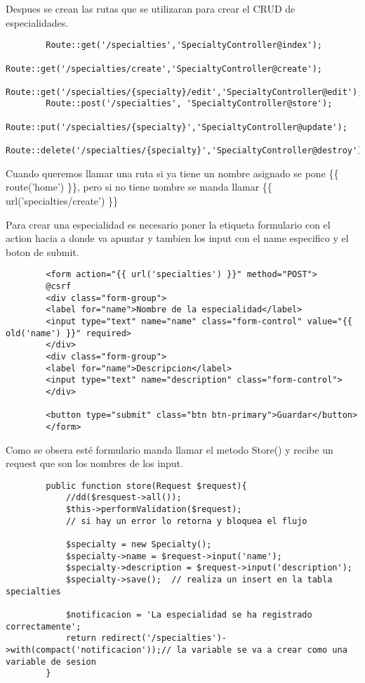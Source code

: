 \documentclass[a4paper]{article}
\begin{document}
	Despues se crean las rutas que se utilizaran para crear el CRUD de especialidades.
	
	\begin{lstlisting}
		Route::get('/specialties','SpecialtyController@index');
		Route::get('/specialties/create','SpecialtyController@create');
		Route::get('/specialties/{specialty}/edit','SpecialtyController@edit');
		Route::post('/specialties', 'SpecialtyController@store');
		Route::put('/specialties/{specialty}','SpecialtyController@update');
		Route::delete('/specialties/{specialty}','SpecialtyController@destroy');
	\end{lstlisting}  

	Cuando queremos llamar una ruta si ya tiene un nombre asignado se pone \{\{ route('home') \}\}, pero si no tiene nombre se manda llamar \{\{ url('specialties/create') \}\}
	
	
	Para crear una especialidad es necesario poner la etiqueta formulario con el action hacia a donde va apuntar y tambien los input con el name especifico y el boton de submit.
	
	\begin{lstlisting}
		<form action="{{ url('specialties') }}" method="POST">
		@csrf
		<div class="form-group">
		<label for="name">Nombre de la especialidad</label>
		<input type="text" name="name" class="form-control" value="{{ old('name') }}" required>
		</div>
		<div class="form-group">
		<label for="name">Descripcion</label>
		<input type="text" name="description" class="form-control">
		</div>
		
		<button type="submit" class="btn btn-primary">Guardar</button>
		</form>
	\end{lstlisting}  

	Como se obsera esté formulario manda llamar el metodo Store() y recibe un request que son los nombres de los input.
	
	\begin{lstlisting}
		public function store(Request $request){
			//dd($resquest->all());
			$this->performValidation($request);
			// si hay un error lo retorna y bloquea el flujo
			
			$specialty = new Specialty();
			$specialty->name = $request->input('name');
			$specialty->description = $request->input('description');
			$specialty->save();  // realiza un insert en la tabla specialties
			
			$notificacion = 'La especialidad se ha registrado correctamente';
			return redirect('/specialties')->with(compact('notificacion'));// la variable se va a crear como una variable de sesion
		}
	\end{lstlisting} 
\end{document}
